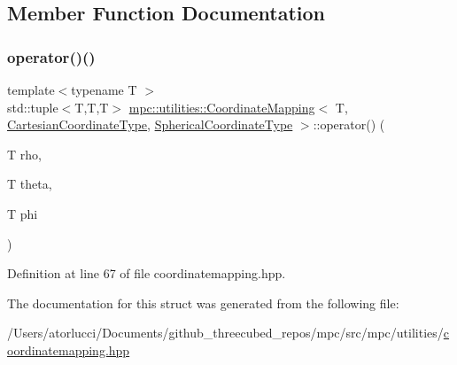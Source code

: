 \subsection{Member Function Documentation}
\mbox{\label{structmpc_1_1utilities_1_1_coordinate_mapping_3_01_t_00_01_cartesian_coordinate_type_00_01_spherical_coordinate_type_01_4_a7a19325e577f99582bd180b87dd932ad}} 
\subsubsection{\texorpdfstring{operator()()}{operator()()}}
{\footnotesize\ttfamily template$<$typename T $>$ \\
std\+::tuple$<$T,T,T$>$ \mbox{\hyperlink{structmpc_1_1utilities_1_1_coordinate_mapping}{mpc\+::utilities\+::\+Coordinate\+Mapping}}$<$ T, \mbox{\hyperlink{structmpc_1_1utilities_1_1_cartesian_coordinate_type}{Cartesian\+Coordinate\+Type}}, \mbox{\hyperlink{structmpc_1_1utilities_1_1_spherical_coordinate_type}{Spherical\+Coordinate\+Type}} $>$\+::operator() (\begin{DoxyParamCaption}\item[{T}]{rho,  }\item[{T}]{theta,  }\item[{T}]{phi }\end{DoxyParamCaption})\hspace{0.3cm}{\ttfamily [inline]}}



Definition at line 67 of file coordinatemapping.\+hpp.



The documentation for this struct was generated from the following file\+:\begin{DoxyCompactItemize}
\item 
/\+Users/atorlucci/\+Documents/github\+\_\+threecubed\+\_\+repos/mpc/src/mpc/utilities/\mbox{\hyperlink{coordinatemapping_8hpp}{coordinatemapping.\+hpp}}\end{DoxyCompactItemize}

